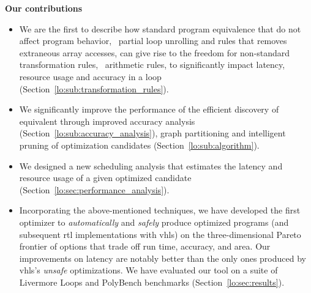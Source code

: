\begin{trivlist}\item{\textbf{Our contributions}}

\begin{itemize}

    \item We are the first to describe how standard program equivalence
    that do not affect program behavior, \eg~partial loop unrolling and
    rules that removes extraneous array accesses, can give rise to the
    freedom for non-standard transformation rules, \eg~arithmetic rules,
    to significantly impact latency, resource usage and accuracy in a loop
    (Section~\ref{lo:sub:transformation_rules}).

    \item We significantly improve the performance of the
    efficient discovery of equivalent through improved accuracy
    analysis (Section~\ref{lo:sub:accuracy_analysis}), graph
    partitioning and intelligent pruning of optimization candidates
    (Section~\ref{lo:sub:algorithm}).

    \item We designed a new scheduling analysis that estimates
    the latency and resource usage of a given optimized candidate
    (Section~\ref{lo:sec:performance_analysis}).

    \item Incorporating the above-mentioned techniques, we have developed the
    first optimizer to \emph{automatically} and \emph{safely} produce optimized
    programs (and subsequent \gls{rtl} implementations with \gls{vhls}) on
    the three-dimensional Pareto frontier of options that trade off run time,
    accuracy, and area.  Our improvements on latency are notably better than
    the only ones produced by \gls{vhls}'s \emph{unsafe} optimizations. We have
    evaluated our tool on a suite of Livermore Loops and PolyBench benchmarks
    (Section~\ref{lo:sec:results}).

\end{itemize}

\end{trivlist}


